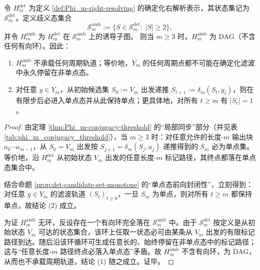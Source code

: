 \begin{theorem}\label{thm:Ym-ambiguity-shell-dag}
令 $H_m^{\mathrm{det}}$ 为定义 \ref{def:Phi_m-right-resolving} 的确定化右解析表示，其状态集记为 $\mathcal{S}_m^{\mathrm{det}}$。定义歧义态集合
\[
\mathcal{S}_m^{\mathrm{amb}}:=\{S\in\mathcal{S}_m^{\mathrm{det}}:\ |S|\ge 2\},
\]
并令 $H_m^{\mathrm{amb}}$ 为 $H_m^{\mathrm{det}}$ 在 $\mathcal{S}_m^{\mathrm{amb}}$ 上的诱导子图。
则当 $m\ge 3$ 时，$H_m^{\mathrm{amb}}$ 为 DAG（不含任何有向环）。因此：
\begin{enumerate}
  \item $H_m^{\mathrm{amb}}$ 不承载任何周期轨道；等价地，$Y_m$ 的任何周期点都不可能在确定化滤波中永久停留在非单点态。
  \item 对任意 $y\in Y_m$，从初始候选集 $S_0:=V_m$ 出发递推 $S_{t+1}:=\delta_m(S_t,y_t)$，则在有限步后必进入单点态并从此保持单点；更具体地，对所有 $t\ge m$ 有 $|S_t|=1$。
\end{enumerate}
\end{theorem}
\begin{proof}
由定理 \ref{thm:Phi_m-conjugacy-threshold} 的“局部同步”部分（并见表 \ref{tab:phi_m_conjugacy_threshold}），当 $m\ge 3$ 时：对任意允许的长度-$m$ 输出块 $a_0\cdots a_{m-1}$，从 $S_0=V_m$ 出发按 $S_{j+1}=\delta_m(S_j,a_j)$ 递推得到的 $S_m$ 必为单点集。等价地，沿 $H_m^{\mathrm{det}}$ 从初始状态 $V_m$ 出发的任意长度-$m$ 标记路径，其终点都落在单点态集合中。

结合命题 \ref{prop:det-candidate-set-monotone} 的“单点态前向封闭性”，立刻得到：对任意 $y\in Y_m$ 的滤波轨道 $(S_t)_{t\ge 0}$，一旦 $S_m$ 为单点，则对所有 $t\ge m$ 都保持单点，故结论 (2) 成立。

为证 $H_m^{\mathrm{amb}}$ 无环，反设存在一个有向环完全落在 $\mathcal{S}_m^{\mathrm{amb}}$ 中。由于 $\mathcal{S}_m^{\mathrm{det}}$ 按定义是从初始状态 $V_m$ 可达的状态集合，该环上任取一状态必可由某条从 $V_m$ 出发的有限标记路径到达。随后沿该环循环可生成任意长的、始终停留在非单点态中的标记路径；这与“任意长度-$m$ 路径终点必落入单点态”矛盾。故 $H_m^{\mathrm{amb}}$ 不含有向环，为 DAG，从而也不承载周期轨道，结论 (1) 随之成立。证毕。
\end{proof}

